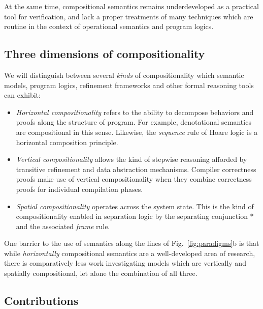 \documentclass[acmsmall,screen,review,anonymous,nonacm]{acmart}
\begin{document}
At the same time,
compositional semantics remains
underdeveloped as a practical tool for verification,
and lack a proper treatments of
many techniques which are routine in the context of
operational semantics and program logics.


\subsection{Three dimensions of compositionality} %

We will distinguish between several \emph{kinds} of compositionality which
semantic models, program logics, refinement frameworks
and other formal reasoning tools
can exhibit:
\begin{itemize}
\item \emph{Horizontal compositionality}
  refers to the ability to decompose behaviors and proofs
  along the structure of program.
  For example, denotational semantics are compositional in this sense.
  Likewise,
  the \emph{sequence} rule of Hoare logic
  is a horizontal composition principle.
\item \emph{Vertical compositionality} allows
  the kind of stepwise reasoning afforded by
  transitive refinement and data abstraction mechanisms.
  Compiler correctness proofs make use of vertical compositionality
  when they combine correctness proofs for individual compilation phases.
\item \emph{Spatial compositionality} operates across the system state.
  This is the kind of compositionality enabled in separation logic
  by the separating conjunction $\ast$
  and the associated \emph{frame} rule.
\end{itemize}
One barrier to the use of semantics
along the lines of Fig.~\ref{fig:paradigms}b
is that while
\emph{horizontally} compositional semantics
are a well-developed area of research,
there is comparatively less work investigating models which are
vertically and spatially compositional,
let alone the combination of all three.


\subsection{Contributions} %
\end{document}
